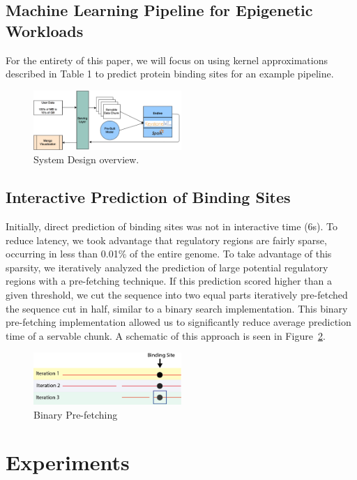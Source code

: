 \documentclass{sig-alternate-05-2015}
\begin{document}
\subsection{Machine Learning Pipeline for Epigenetic Workloads}
For the entirety of this paper, we will focus on using kernel approximations described in Table 1 to predict protein binding sites for an example pipeline.

\begin{figure}
  \label{fig:pipeline}
  \includegraphics[width=0.5\textwidth]{figures/systemDiagram}
  \caption{System Design overview.}
\end{figure}

\subsection{Interactive Prediction of Binding Sites}
Initially, direct prediction of binding sites was not in interactive time (6s). To reduce latency, we took advantage that regulatory regions are fairly sparse, occurring in less than 0.01\% of the entire genome. To take advantage of this sparsity, we iteratively analyzed the prediction of large potential regulatory regions with a pre-fetching technique. If this prediction scored higher than a given threshold, we cut the sequence into two equal parts iteratively pre-fetched the sequence cut in half, similar to a binary search implementation. This binary pre-fetching implementation  allowed us to significantly reduce average prediction time of a servable chunk. A schematic of this approach is seen in Figure~\ref{fig:iterations}.

\begin{figure}[b]
  \label{fig:iterations}
  \includegraphics[width=0.5\textwidth]{figures/iterations.png}
  \caption{Binary Pre-fetching}
\end{figure}

\section{Experiments}
\end{document}
